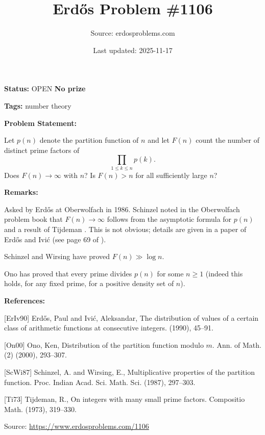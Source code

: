 \documentclass{article}
\title{Erd\H{o}s Problem \#1106}
\date{Last updated: 2025-11-17}
\author{Source: erdosproblems.com}
\begin{document}
\maketitle

\noindent\textbf{Status:} OPEN \quad \textbf{No prize}

\noindent\textbf{Tags:} number theory

\medskip
\noindent\textbf{Problem Statement:}

Let $p(n)$ denote the partition function of $n$ and let $F(n)$ count the number of distinct prime factors of\[\prod_{1\leq k\leq n}p(k).\]Does $F(n)\to \infty$ with $n$? Is $F(n)>n$ for all sufficiently large $n$?

\bigskip
\noindent\textbf{Remarks:}

Asked by Erd\H{o}s at Oberwolfach in 1986. Schinzel noted in the Oberwolfach problem book that $F(n)\to \infty$ follows from the asymptotic formula for $p(n)$ and a result of Tijdeman \cite{Ti73}. This is not obvious; details are given in a paper of Erd\H{o}s and Ivi\'{c} (see page 69 of \cite{ErIv90}).

Schinzel and Wirsing \cite{ScWi87} have proved $F(n) \gg \log n$. 

Ono \cite{On00} has proved that every prime divides $p(n)$ for some $n\geq 1$ (indeed this holds, for any fixed prime, for a positive density set of $n$).

\bigskip
\noindent\textbf{References:}

[ErIv90] Erd\H{o}s, Paul and Ivi\'c, Aleksandar, The distribution of values of a certain class of arithmetic
functions at consecutive integers. (1990), 45--91.
 
 [On00] Ono, Ken, Distribution of the partition function modulo {$m$}. Ann. of Math. (2) (2000), 293--307.
 
 [ScWi87] Schinzel, A. and Wirsing, E., Multiplicative properties of the partition function. Proc. Indian Acad. Sci. Math. Sci. (1987), 297--303.
 
 [Ti73] Tijdeman, R., On integers with many small prime factors. Compositio Math. (1973), 319--330.

\bigskip
\noindent\small{Source: \url{https://www.erdosproblems.com/1106}}
\end{document}
